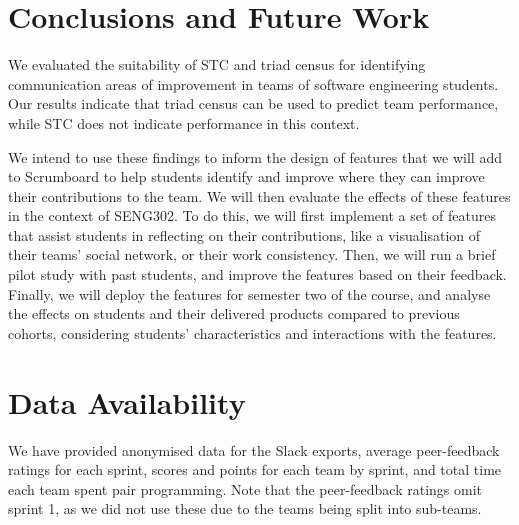 \section{Conclusions and Future Work}
\label{conclusion}
We evaluated the suitability of STC and triad census for identifying communication areas of improvement in teams of software engineering students. Our results indicate that triad census can be used to predict team performance, while STC does not indicate performance in this context.

We intend to use these findings to inform the design of features that we will add to Scrumboard to help students identify and improve where they can improve their contributions to the team. We will then evaluate the effects of these features in the context of SENG302. To do this, we will first implement a set of features that assist students in reflecting on their contributions, like a visualisation of their teams' social network, or their work consistency. Then, we will run a brief pilot study with past students, and improve the features based on their feedback. Finally, we will deploy the features for semester two of the course, and analyse the effects on students and their delivered products compared to previous cohorts, considering students' characteristics and interactions with the features. 

\section{Data Availability}
We have provided anonymised data for the Slack exports, average peer-feedback ratings for each sprint, scores and points for each team by sprint, and total time each team spent pair programming. Note that the peer-feedback ratings omit sprint 1, as we did not use these due to the teams being split into sub-teams.